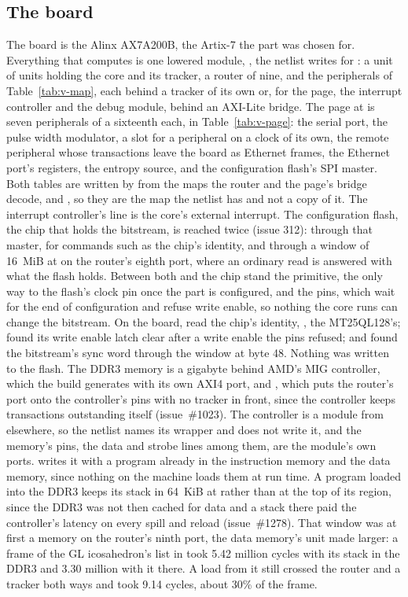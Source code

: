 \documentclass[journal,onecolumn,9pt]{IEEEtran}
\begin{document}
\subsection{The board}

The board is the Alinx AX7A200B, the Artix-7 the part was chosen for.
Everything that computes is one lowered module, , the
netlist \code{\#[lower]} writes for : a
unit of units holding the core and its tracker, a router of nine, and
the peripherals of Table~\ref{tab:v-map}, each behind a tracker of its
own or, for the page, the interrupt controller and the debug module,
behind an AXI-Lite bridge. The page at  is seven
peripherals of a sixteenth each, in Table~\ref{tab:v-page}: the
serial port, the pulse width modulator, a slot for a peripheral on a
clock of its own, the remote peripheral whose transactions leave the
board as Ethernet frames, the Ethernet port's registers, the entropy
source, and the configuration flash's SPI master. Both tables are written by  from
the maps the router and the page's bridge decode,  and
, so they are the map the netlist has and not a copy of
it. The interrupt controller's line is the core's external interrupt.
The configuration flash, the chip that holds the bitstream, is reached
twice (issue 312): through that master, for commands such as the
chip's identity, and through a window of 16~MiB at
 on the router's eighth port, where an ordinary
read is answered with what the flash holds. Between both and the chip
stand the  primitive, the only way to the flash's
clock pin once the part is configured, and the pins, which wait for
the end of configuration and refuse write enable, so nothing the core
runs can change the bitstream. On the board,  read the
chip's identity, , the MT25QL128's; found its write
enable latch clear after a write enable the pins refused; and found
the bitstream's sync word through the window at byte 48. Nothing was
written to the flash.
The DDR3 memory is a gigabyte behind AMD's MIG controller, which the
build generates with its own AXI4 port, and , which
puts the router's port onto the controller's pins with no tracker in
front, since the controller keeps transactions outstanding itself
(issue~\#1023). The controller is a module from elsewhere, so the
netlist names its wrapper and does not write it, and the memory's pins, the data and strobe lines among
them, are the module's own ports.  writes it with
a program already in the instruction memory and the data memory,
since nothing on the machine loads them at run time.
A program loaded into the DDR3 keeps its stack in 64~KiB at
 rather than at the top of its region, since the DDR3
was not then cached for data and a stack there paid the controller's latency
on every spill and reload (issue~\#1278). That window was at first a
memory on the router's ninth port, the data memory's unit made larger:
a frame of the GL icosahedron's list in  took 5.42
million cycles with its stack in the DDR3 and 3.30 million with it
there. A load from it still crossed the router and a tracker both ways
and took 9.14 cycles, about 30\% of the frame.
\end{document}
